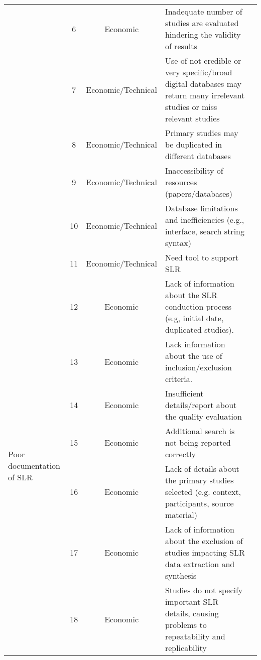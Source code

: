 \begin{table*}[!ht]
\begin{tabular}{|p{1.6cm}|c|c|p{7.5cm}|p{2.2cm}|}
& 6 & Economic & Inadequate number of studies are evaluated hindering the validity of results & \cite{Riaz2010}
\cite{Zhou2016Threats}  \\ \cline{2-5} 
  & 7 & Economic/Technical & Use of not credible or very specific/broad digital databases may return many irrelevant studies or miss relevant studies &  \cite{Ampatzoglou2019}\cite{Imtiaz2013} \cite{Kitchenham2013}  \cite{Riaz2010} \cite{Zhou2016Threats}\\ \cline{2-5} 
& 8 & Economic/Technical & Primary studies may be duplicated in different databases & \cite{Zhou2016Threats} \\ \cline{2-5} 
& 9 & Economic/Technical & Inaccessibility of resources (papers/databases) & \cite{Zhou2016Threats} \\ \cline{2-5}
& 10 & Economic/Technical & Database limitations and  inefficiencies (e.g., interface, search string syntax) & \cite{Imtiaz2013} \cite{Kitchenham2013}\cite{Riaz2010}  \\ \cline{2-5}
& 11 & Economic/Technical & Need tool to support SLR & \cite{Imtiaz2013}\cite{Kitchenham2013}  \\ \hline 
\multirow{9}{*}{\begin{minipage}{1.6cm} \centering Poor documentation of SLR \end{minipage}} & 12 & Economic & Lack of information about the SLR conduction process (e.g, initial date, duplicated studies). & \cite{Budgen2018Reporting} \cite{Kitchenham2013} \cite{Riaz2010} \\ \cline{2-5} 
 & 13 & Economic & Lack information about the use of inclusion/exclusion criteria. & \cite{Budgen2018Reporting} \cite{Kitchenham2013} \\ \cline{2-5} 
 & 14 & Economic & Insufficient details/report about the quality evaluation & \cite{Budgen2018Reporting} \\ \cline{2-5} 
 & 15 & Economic & Additional search is not being reported correctly & \cite{Budgen2018Reporting} \\ \cline{2-5} 
  & 16 & Economic & Lack of details about the primary studies selected (e.g. context, participants, source material) & \cite{Budgen2018Reporting} \\ \cline{2-5} 
 & 17 & Economic & Lack of information about the exclusion of studies impacting SLR data extraction and synthesis & \cite{Budgen2018Reporting} \\ \cline{2-5} 
 & 18 & Economic & Studies do not specify important SLR details, causing problems to repeatability and replicability & \cite{Ampatzoglou2019}\cite{Riaz2010}\cite{Zhou2016Threats}   \\ \cline{2-5} 

\end{tabular}
\end{table*}
